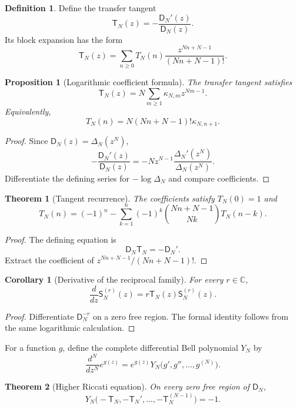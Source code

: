 \documentclass{aomart}
\newtheorem{theorem}{Theorem}[section]
\newtheorem{proposition}[proposition]{Proposition}
\newtheorem{corollary}[corollary]{Corollary}
\theoremstyle{definition}
\newtheorem{definition}[definition]{Definition}
\theoremstyle{remark}
\newcommand{\CC}{\mathbb C}
\newcommand{\Dfun}{\mathsf D}
\newcommand{\Sfun}{\mathsf S}
\newcommand{\Tfun}{\mathsf T}
\begin{document}
\begin{definition}\label{def:transfer_tangent}
Define the transfer tangent
\[
\Tfun_N(z)
=-\frac{\Dfun_N'(z)}{\Dfun_N(z)}.
\]
Its block expansion has the form
\[
\Tfun_N(z)
=
\sum_{n\geq0}T_N(n)
\frac{z^{Nn+N-1}}{(Nn+N-1)!}.
\]
\end{definition}

\begin{proposition}[Logarithmic coefficient formula]\label{prop:tangent_kappa}
The transfer tangent satisfies
\[
\Tfun_N(z)
=
N\sum_{m\geq1}\kappa_{N,m}z^{Nm-1}.
\]
Equivalently,
\[
T_N(n)
=
N(Nn+N-1)!\kappa_{N,n+1}.
\]
\end{proposition}

\begin{proof}
Since $\Dfun_N(z)=\Delta_N(z^N)$,
\[
-\frac{\Dfun_N'(z)}{\Dfun_N(z)}
=
-Nz^{N-1}\frac{\Delta_N'(z^N)}{\Delta_N(z^N)}.
\]
Differentiate the defining series for $-\log\Delta_N$ and compare coefficients.
\end{proof}

\begin{theorem}[Tangent recurrence]\label{thm:tangent_recurrence}
The coefficients satisfy $T_N(0)=1$ and
\[
T_N(n)
=
(-1)^n
-
\sum_{k=1}^{n}
(-1)^k
\binom{Nn+N-1}{Nk}
T_N(n-k).
\]
\end{theorem}

\begin{proof}
The defining equation is
\[
\Dfun_N\Tfun_N=-\Dfun_N'.
\]
Extract the coefficient of $z^{Nn+N-1}/(Nn+N-1)!$.
\end{proof}

\begin{corollary}[Derivative of the reciprocal family]\label{cor:reciprocal_derivative}
For every $r\in\CC$,
\[
\frac{d}{dz}\Sfun_N^{(r)}(z)
=
r\Tfun_N(z)\Sfun_N^{(r)}(z).
\]
\end{corollary}

\begin{proof}
Differentiate $\Dfun_N^{-r}$ on a zero free region.  The formal identity follows from the same logarithmic calculation.
\end{proof}

For a function $g$, define the complete differential Bell polynomial $Y_N$ by
\[
\frac{d^N}{dz^N}e^{g(z)}
=
e^{g(z)}Y_N\bigl(g',g'',\ldots,g^{(N)}\bigr).
\]

\begin{theorem}[Higher Riccati equation]\label{thm:higher_riccati}
On every zero free region of $\Dfun_N$,
\[
Y_N\bigl(
-\Tfun_N,
-\Tfun_N',
\ldots,
-\Tfun_N^{(N-1)}
\bigr)
=-1.
\]
\end{theorem}
\end{document}
